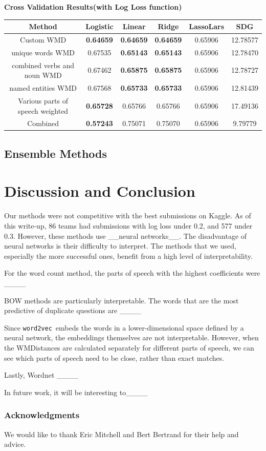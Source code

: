 \documentclass{article} %
\newcommand{\wordtvec}{\texttt{word2vec}}
\begin{document}
\begin{center}
\textbf{Cross Validation Results(with Log Loss function)}

	\begin{tabular}{|c|c|c|c|c|c|} \hline
	Method & Logistic & Linear & Ridge & LassoLars & SDG \\ \hline
	Custom WMD & \textbf{0.64659} & \textbf{0.64659} &\textbf{ 0.64659} & 0.65906 & 12.78577 \\ \hline
	unique words WMD & 0.67535 & \textbf{0.65143} & \textbf{0.65143} & 0.65906 & 12.78470 \\ \hline
	combined verbs and noun WMD & 0.67462 & \textbf{0.65875} & \textbf{0.65875} & 0.65906 & 12.78727 \\ \hline
	named entities WMD & 0.67568 & \textbf{0.65733} & \textbf{0.65733} & 0.65906 & 12.81439 \\ \hline
	Various parts of speech weighted & \textbf{0.65728} & 0.65766 & 0.65766 & 0.65906 & 17.49136\\ \hline
	Combined & \textbf{0.57243} & 0.75071 & 0.75070 & 0.65906 & 9.79779 \\ \hline
	\end{tabular}
\end{center}

\subsection{Ensemble Methods}

\section{Discussion and Conclusion}

Our methods were not competitive with the best submissions on Kaggle. As of this write-up, 86 teams had submissions with log loss under 0.2, and 577 under 0.3. However, these methods use \_\_neural networks\_\_. The disadvantage of neural networks is their difficulty to interpret. The methods that we used, especially the more successful ones, benefit from a high level of interpretability. 

For the word count method, the parts of speech with the highest coefficients were \_\_\_\_

BOW methods are particularly interpretable. The words that are the most predictive of duplicate questions are \_\_\_\_

Since \wordtvec\ embeds the words in a lower-dimensional space defined by a neural network, the embeddings themselves are not interpretable. However, when the WMDistances are calculated separately for different parts of speech, we can see which parts of speech need to be close, rather than exact matches.

Lastly, Wordnet \_\_\_\_

In future work, it will be interesting to\_\_\_\_

\subsubsection*{Acknowledgments}

We would like to thank Eric Mitchell and Bert Bertrand for their help and advice.

\printbibliography
\end{document}
